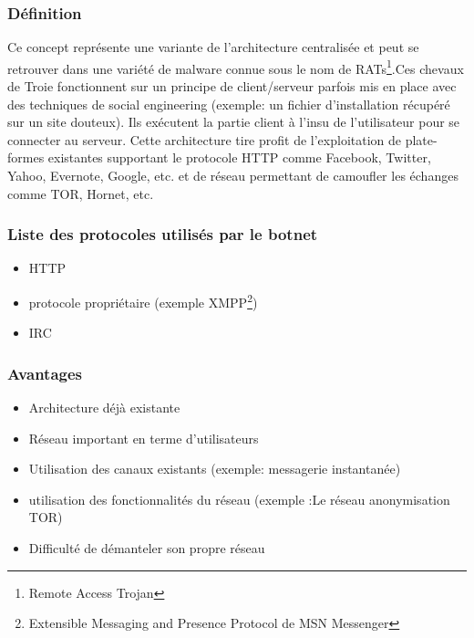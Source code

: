 
\subsubsection{Définition}
Ce concept représente une variante de l'architecture centralisée et peut se retrouver dans une variété de malware connue sous le nom de RATs\footnote{Remote Access Trojan}.Ces chevaux de Troie fonctionnent sur un principe de client/serveur parfois mis en place avec des techniques de social engineering (exemple: un fichier d'installation récupéré sur un site douteux). Ils exécutent la partie client à l'insu de l'utilisateur pour se connecter au serveur.
\newline Cette architecture tire profit de l'exploitation de plate-formes existantes supportant le protocole HTTP comme Facebook, Twitter, Yahoo, Evernote, Google, etc. et de réseau permettant de camoufler les échanges comme TOR, Hornet, etc.

\subsubsection {Liste des protocoles utilisés par le botnet}
\begin{itemize}
	\item HTTP
	\item protocole propriétaire (exemple XMPP\footnote{Extensible Messaging and Presence Protocol de MSN Messenger})
	\item IRC
\end{itemize}

\subsubsection{Avantages}
\begin{itemize}
	\item Architecture déjà existante
	\item Réseau important en terme d'utilisateurs
	\item Utilisation des canaux existants (exemple: messagerie instantanée)
	\item utilisation des fonctionnalités du réseau (exemple :Le réseau anonymisation TOR)
	\item Difficulté de démanteler son propre réseau
\end{itemize}


